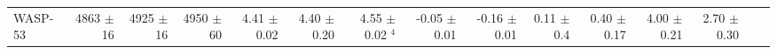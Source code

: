 \begin{sidewaystable*}[t!]
{\begin{tabular}{l r r r r r r r r r r r r r r}

WASP-53  
&  4863  $\pm$ 16 
& 4925 $\pm$ 16
&  4950 $\pm$ 60
&   4.41  $\pm$ 0.02  
&  4.40  $\pm$ 0.20 
&  4.55  $\pm$ 0.02 $^4$
&  -0.05  $\pm$ 0.01
& -0.16  $\pm$ 0.01 
&  0.11   $\pm$ 0.4 
&  0.40  $\pm$ 0.17 
& 4.00  $\pm$ 0.21 
&  2.70   $\pm$ 0.30 \\




\end{tabular}}
\end{sidewaystable*}
